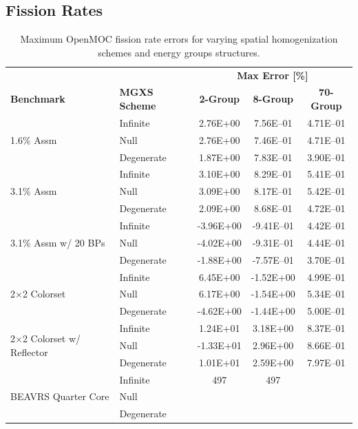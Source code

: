 \subsection{Fission Rates}
\label{subsec:chap8-fiss-rates}

\begin{table}[h!]
  \centering
  \caption[Maximum OpenMOC fission rate errors]{Maximum OpenMOC fission rate errors for varying spatial homogenization schemes and energy groups structures.}
  \small
  \label{table:chap8-openmoc-max-fiss-rates}
  \vspace{6pt}
  \begin{tabular}{l l c c c}
  \toprule
  \rowcolor{lightgray}
  & & \multicolumn{3}{c}{\cellcolor{lightgray} \textbf{Max Error [\%]}} \\
  \multirow{-2}{*}{\cellcolor{lightgray} \bf Benchmark} &
  \multirow{-2}{*}{\cellcolor{lightgray} \bf \ac{MGXS} Scheme} &
  \multicolumn{1}{c}{{\cellcolor{lightgray} \bf 2-Group}} &
  \multicolumn{1}{c}{{\cellcolor{lightgray} \bf 8-Group}} &
  \multicolumn{1}{c}{{\cellcolor{lightgray} \bf 70-Group}} \\
  \midrule
\multirow{3}{*}{\parbox{2.5cm}{1.6\% Assm}} & Infinite & 2.76E+00 & 7.56E--01 & 4.71E--01 \\
& Null & 2.76E+00 & 7.46E--01 & 4.71E--01 \\
& Degenerate & 1.87E+00 & 7.83E--01 & 3.90E--01 \\
  \midrule
\multirow{3}{*}{\parbox{2.5cm}{3.1\% Assm}} & Infinite & 3.10E+00 & 8.29E--01 & 5.41E--01 \\
& Null & 3.09E+00 & 8.17E--01 & 5.42E--01 \\
& Degenerate & 2.09E+00 & 8.68E--01 & 4.72E--01 \\
  \midrule
\multirow{3}{*}{\parbox{2.5cm}{3.1\% Assm w/ 20 BPs}} & Infinite & -3.96E+00 & -9.41E--01 & 4.42E--01 \\
& Null & -4.02E+00 & -9.31E--01 & 4.44E--01 \\
& Degenerate & -1.88E+00 & -7.57E--01 & 3.70E--01 \\
  \midrule
\multirow{3}{*}{\parbox{2.5cm}{2$\times$2 Colorset}} & Infinite & 6.45E+00 & -1.52E+00 & 4.99E--01 \\
& Null & 6.17E+00 & -1.54E+00 & 5.34E--01 \\
& Degenerate & -4.62E+00 & -1.44E+00 & 5.00E--01 \\
  \midrule
\multirow{3}{*}{\parbox{2.5cm}{2$\times$2 Colorset w/ Reflector}} & Infinite & 1.24E+01 & 3.18E+00 & 8.37E--01 \\
& Null & -1.33E+01 & 2.96E+00 & 8.66E--01 \\
& Degenerate & 1.01E+01 & 2.59E+00 & 7.97E--01 \\
  \midrule
  \multirow{3}{*}{\parbox{2cm}{\ac{BEAVRS} Quarter Core}} & Infinite & 497 & 497 & \\
  & Null & & & \\
  & Degenerate & & & \\
  \bottomrule
\end{tabular}
\end{table}

